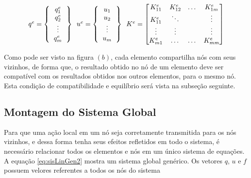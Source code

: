 \documentclass[
    12pt,               %
    openright,          %
    oneside,
    a4paper,            %
    english,            %
    french,             %
    spanish,            %
    brazil              %
    ]{abntex2}
\begin{document}
  \begin{equation}
     \label{eq:assembly}
     \begin{tabular}{c c c}
     $q^e = 
         \left \{
         \begin{tabular}{c}
             $q^e_1$ \\
             $q^e_2$ \\
             \vdots \\
             $q^e_m$
         \end{tabular}       
         \right \}$
         \
     $u^e = 
         \left \{
         \begin{tabular}{c}
             $u_1$ \\
             $u_2$ \\
             \vdots \\
             $u_m$
         \end{tabular}       
         \right \}   $
         \
         $K^e =
         \begin{bmatrix}
             K^e_{11}    & K^e_{12}  & \dots     & K^e_{1m} \\
             K^e_{11}    & \ddots  & \   & \vdots \\
             \vdots  & \vdots     & \    & \vdots \\
             K^e_{m1}    & \dots   & \dots   & K^e_{mm} 
         \end{bmatrix}    $      
     \end{tabular} 
  \end{equation}
  
  
Como pode ser visto na figura \label{fig:malhaGenerica}$(b)$, cada elemento compartilha nós com seus vizinhos, de forma que, o resultado obtido no nó de um elemento deve ser compatível com os resultados obtidos nos outros elementos, para o mesmo nó. Esta condição de compatibilidade e equilíbrio será vista na subseção seguinte.
 
 \subsection{Montagem do Sistema Global}
 
Para que uma ação local em um nó seja corretamente transmitida para os nós vizinhos, e dessa forma tenha seus efeitos refletidos em todo o sistema, é necessário relacionar todos os elementos e nós em um único sistema de equações. A equação \ref{eq:sisLinGen2} mostra um sistema global genérico. Os vetores $q$, $u$ e $f$ possuem velores referentes a todos os nós do sistema
\end{document}
